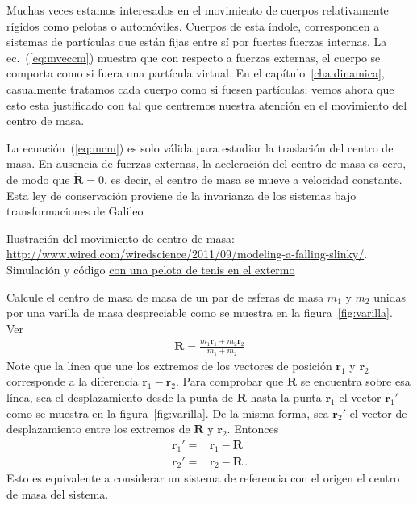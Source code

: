Muchas veces estamos interesados en el movimiento de cuerpos relativamente rígidos como pelotas o automóviles. Cuerpos de esta índole, corresponden a sistemas de partículas que están fijas entre sí por fuertes fuerzas internas. La ec.~(\ref{eq:mveccm}) muestra que con respecto a fuerzas externas, el cuerpo se comporta como si fuera una partícula virtual. En el capítulo~\ref{cha:dinamica}, casualmente tratamos cada cuerpo como si fuesen partículas; vemos ahora que esto esta justificado con tal que centremos nuestra atención en el movimiento del centro de masa. 

La ecuación~(\ref{eq:mcm}) es solo válida para estudiar la traslación del centro de masa. En ausencia de fuerzas externas, la aceleración del centro de masa es cero, de modo que $\ddot{\mathbf{R}}=0$, es decir, el centro de masa se mueve a velocidad constante. Esta ley de conservación proviene de la invarianza de los sistemas bajo transformaciones de Galileo

Ilustración del movimiento de centro de masa: \url{http://www.wired.com/wiredscience/2011/09/modeling-a-falling-slinky/}. Simulación y código  \href{http://www.wired.com/wiredscience/2011/10/more-slinky-physics/}{con una pelota de tenis en el extermo}

\ejemplo{}
Calcule el centro de masa de masa de un par de esferas de masa $m_1$ y $m_2$ unidas por una varilla de masa despreciable como se muestra en la figura~\ref{fig:varilla}. Ver
  \begin{align}
    \label{eq:mbaton}
    \mathbf{R}=\frac{m_1\mathbf{r}_1+m_2\mathbf{r}_2}{m_1+m_2}
  \end{align}
Note que la línea que une los extremos de los vectores de posición $\mathbf{r}_1$ y $\mathbf{r}_2$ corresponde a la diferencia $\mathbf{r}_1-\mathbf{r}_2$. Para comprobar que $\mathbf{R}$ se encuentra sobre esa línea,
sea el desplazamiento desde la punta de $\mathbf{R}$ hasta la punta $\mathbf{r}_1$ el vector $\mathbf{r}_1'$ como se muestra en la figura~\ref{fig:varilla}. De la misma forma, sea $\mathbf{r}_2'$ el vector de desplazamiento entre los extremos de $\mathbf{R}$ y $\mathbf{r}_2$. Entonces
\begin{align}
  \mathbf{r}_1'=&\mathbf{r}_1-\mathbf{R}\nonumber\\
  \mathbf{r}_2'=&\mathbf{r}_2-\mathbf{R}\,.
\end{align}
Esto es equivalente a considerar un sistema de referencia con el
origen el centro de masa del sistema.

